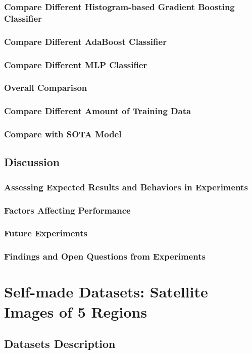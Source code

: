 \documentclass[twocolumn]{extarticle}
\begin{document}
\subsubsection{Compare Different Histogram-based Gradient Boosting Classifier}
\subsubsection{Compare Different AdaBoost Classifier}
\subsubsection{Compare Different MLP Classifier}
\subsubsection{Overall Comparison}
\subsubsection{Compare Different Amount of Training Data}
\subsubsection{Compare with SOTA Model}

\subsection{Discussion}
\subsubsection{Assessing Expected Results and Behaviors in Experiments}
\subsubsection{Factors Affecting Performance}
\subsubsection{Future Experiments}
\subsubsection{Findings and Open Questions from Experiments}
\section{Self-made Datasets: Satellite Images of 5 Regions}
\subsection{Datasets Description}
\end{document}
